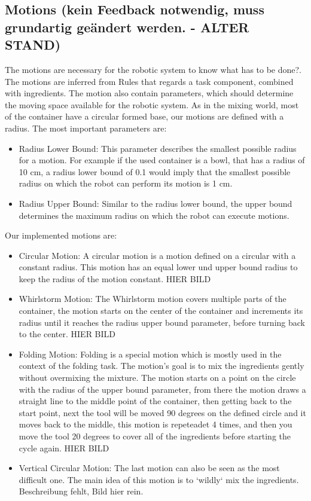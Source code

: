 \subsection{Motions (kein Feedback notwendig, muss grundartig geändert werden. - ALTER STAND)}
The motions are necessary for the robotic system to know what has to be done?. The motions are inferred from Rules that regards a task component, combined with ingredients.
The motion also contain parameters, which should determine the moving space available for the robotic system. As in the mixing world, most of the container have a circular formed base, our motions are defined with a radius.
The most important parameters are:
\begin{itemize}
    \item Radius Lower Bound: This parameter describes the smallest possible radius for a motion. For example if the used container is a bowl, that has a radius of 10 cm, a radius lower bound of 0.1 would imply that the smallest possible radius on which the robot can perform its motion is 1 cm.
    \item Radius Upper Bound: Similar to the radius lower bound, the upper bound determines the maximum radius on which the robot can execute motions.
\end{itemize}
Our implemented motions are:
\begin{itemize}
    \item Circular Motion: A circular motion is a motion defined on a circular with a constant radius. This motion has an equal lower und upper bound radius to keep the radius of the motion constant.  \newline HIER BILD
    \item Whirlstorm Motion: The Whirlstorm motion covers multiple parts of the container, the motion starts on the center of the container and increments its radius until it reaches the radius upper bound parameter, before turning back to the center. \newline HIER BILD
    \item Folding Motion: Folding is a special motion which is mostly used in the context of the folding task. The motion's goal is to mix the ingredients gently without overmixing the mixture. The motion starts on a point on the circle with the radius of the upper bound parameter, from there the motion draws a straight line to the middle point of the container, then getting back to the start point, next the tool will be moved 90 degrees on the defined circle and it moves back to the middle, this motion is repeteadet 4 times, and then you move the tool 20 degrees to cover all of the ingredients before starting the cycle again. \newline HIER BILD
    \item Vertical Circular Motion: The last motion can also be seen as the most difficult one. The main idea of this motion is to `wildly` mix the ingredients. Beschreibung fehlt, Bild hier rein.
\end{itemize}

